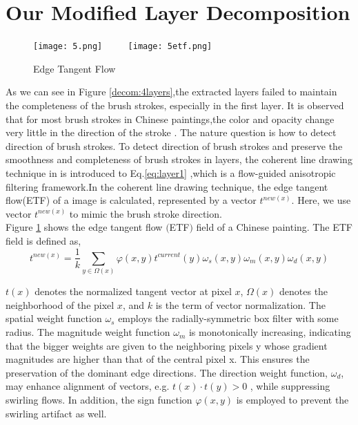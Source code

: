 \section{Our Modified Layer Decomposition} \label{secmodimesr}
\begin{figure}[H]
	\centering
	\texttt{[image: 5.png]}
	~~~~
	\texttt{[image: 5etf.png]}
	\caption{Edge Tangent Flow}
	\label{ETF}
\end{figure}

As we can see in Figure \ref{decom:4layers},the extracted layers failed to maintain the completeness of the brush strokes, especially in the first layer. 
It is observed that for most brush strokes in Chinese paintings,the color and opacity change very little in the direction of the stroke \cite{xu2006animating}. The nature question is how to detect direction of brush strokes. 
To detect direction of brush strokes and preserve the smoothness and completeness of brush strokes in layers, the coherent line drawing technique in \cite{kang2007coherent} is introduced to Eq.\ref{eq:layer1} ,which is a flow-guided anisotropic filtering framework.In the coherent line drawing technique, the edge tangent flow(ETF) of a image is calculated, represented by a vector $t^{new(x)} $. Here, we use vector $t^{new(x)} $ to mimic the brush stroke direction. \\
Figure \ref{ETF} shows the edge tangent flow $($ETF$)$ field of a Chinese painting.\newline
The ETF field is defined as,
\begin{equation}
 t^{new(x)}=\frac{1}{k}\sum_{y\in\Omega(x)} \varphi(x,y)t^{current}(y)\omega_{s}(x,y)\omega_{m}(x,y)\omega_{d}(x,y)
 \label{eq:layer_etf} 
\end{equation}

$t(x)$ denotes the normalized tangent vector at pixel $x$, $\Omega(x)$ denotes the neighborhood of the pixel $x$, and $k$ is the term of vector normalization. The spatial weight function $\omega_{s}$ employs the radially-symmetric box filter with some radius. The magnitude weight function $\omega_{m}$ is monotonically increasing, indicating that the bigger weights are given to the neighboring pixels y whose gradient magnitudes are higher than that of the central pixel x. This ensures the preservation of the dominant edge directions. The direction weight function, $\omega_{d}$, may enhance alignment of vectors, e.g. $t(x)\cdot t(y)>0$ , while suppressing swirling flows. In addition, the sign function $\varphi(x,y)$  is employed to prevent the swirling artifact as well.

